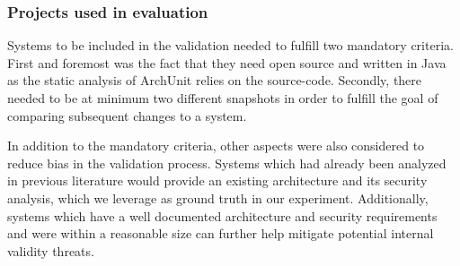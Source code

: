 \subsubsection{Projects used in evaluation}
Systems to be included in the validation needed to fulfill two mandatory criteria. First and foremost was the fact that they need open source and written in Java as the static analysis of ArchUnit relies on the source-code. Secondly, there needed to be at minimum two different snapshots in order to fulfill the goal of comparing subsequent changes to a system.  

In addition to the mandatory criteria, other aspects were also considered to reduce bias in the validation process. Systems which had already been analyzed in previous literature \cite{peldszus_secure_2019, abi-antoun_static_2009} would provide an existing architecture and its security analysis, which we leverage as ground truth in our experiment. Additionally, systems which have a well documented architecture and security requirements and were within a reasonable size can further help mitigate potential internal validity threats. 